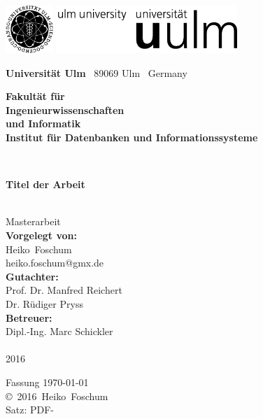 \documentclass[a4paper,10pt,twoside,openright,DIV=15,BCOR25mm
]{scrbook}
\makeatletter
\newcommand{\fullname}{Heiko~Foschum}
\newcommand{\email}{heiko.foschum@gmx.de}
\newcommand{\titel}{Titel der Arbeit}
\newcommand{\jahr}{2016}
\newcommand{\gutachterA}{Prof. Dr. Manfred Reichert}
\newcommand{\gutachterB}{Dr. Rüdiger Pryss}
\newcommand{\betreuer}{Dipl.-Ing. Marc Schickler}
\newcommand{\fakultaet}{Ingenieurwissenschaften\\und Informatik}
\newcommand{\institut}{Institut für Datenbanken und Informationssysteme}
\makeatother
\begin{document}
\frontmatter

\thispagestyle{empty}
\begin{addmargin*}[4mm]{-10mm}

\includegraphics[height=1.8cm]{images/unilogo_bild}
\hfill
\includegraphics[height=1.8cm]{images/unilogo_wort}\\[1em]

{\footnotesize
{\bfseries Universität Ulm} \textbar ~89069 Ulm \textbar ~Germany
\hspace*{116mm}\parbox[t]{38mm}{\bfseries Fakultät für\\
\fakultaet\\
\mdseries \institut}\\[2cm]

\parbox{140mm}{\bfseries \huge \titel}\\[0.5em]
{\footnotesize Masterarbeit}\\[3em]

{\footnotesize \bfseries Vorgelegt von:}\\
{\footnotesize \fullname\\\email}\\[2em]
{\footnotesize \bfseries Gutachter:}\\ 
{\footnotesize\gutachterA\\
\gutachterB}\\[2em]
{\footnotesize \bfseries Betreuer:}\\ 
{\footnotesize\betreuer}\\\\
{\footnotesize\jahr}
}
\end{addmargin*}


\clearpage
\thispagestyle{empty}
{ \small
  \flushleft
  Fassung \today \\\vfill
  \copyright~\jahr~\fullname\\[0.5em]
  Satz: PDF-\LaTeXe
}
\end{document}
